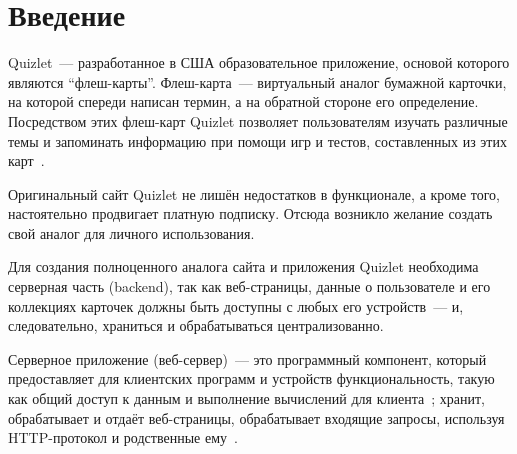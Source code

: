 \documentclass[14pt]{matmex-diploma-custom}
\begin{document}
\maketitle
\tableofcontents
\section*{Введение}
Quizlet~--- разработанное в США образовательное приложение, основой которого являются ``флеш-карты''. Флеш-карта~--- виртуальный аналог бумажной карточки, на которой спереди написан термин, а на обратной стороне его определение. Посредством этих флеш-карт Quizlet позволяет пользователям изучать различные темы и запоминать информацию при помощи игр и тестов, составленных из этих карт~\cite{wiki:quizlet}.

Оригинальный сайт Quizlet не лишён недостатков в функционале, а кроме того, настоятельно продвигает платную подписку. Отсюда возникло желание создать свой аналог для личного использования.

Для создания полноценного аналога сайта и приложения Quizlet необходима серверная часть (backend), так как веб-страницы, данные о пользователе и его коллекциях карточек должны быть доступны с любых его устройств~--- и, следовательно, храниться и обрабатываться централизованно.

Серверное приложение (веб-сервер)~--- это программный компонент, который предоставляет для клиентских программ и устройств функциональность, такую как общий доступ к данным и выполнение вычислений для клиента~\cite{wiki:server}; хранит, обрабатывает и отдаёт веб-страницы, обрабатывает входящие запросы, используя HTTP-протокол и родственные ему~\cite{wiki:webserver}.
\end{document}
